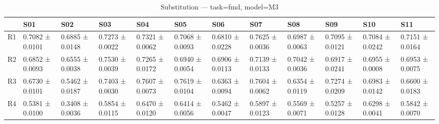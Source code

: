 \begin{table}[htbp]
\centering
\caption{Substitution — task=fmd, model=M3}
\label{tab:sub:fmd:M3}
\begin{tabular}{llllllllllll}
\toprule
\toprule
 & S01 & S02 & S03 & S04 & S05 & S06 & S07 & S08 & S09 & S10 & S11 \\
\midrule
\midrule
R1 & 0.7082 ± 0.0101 & 0.6885 ± 0.0148 & 0.7273 ± 0.0022 & 0.7321 ± 0.0062 & 0.7068 ± 0.0093 & 0.6810 ± 0.0228 & 0.7625 ± 0.0036 & 0.6987 ± 0.0063 & 0.7095 ± 0.0121 & 0.7084 ± 0.0242 & 0.7151 ± 0.0164 \\
R2 & 0.6852 ± 0.0093 & 0.6555 ± 0.0038 & 0.7530 ± 0.0039 & 0.7265 ± 0.0172 & 0.6940 ± 0.0054 & 0.6906 ± 0.0113 & 0.7139 ± 0.0133 & 0.7042 ± 0.0036 & 0.6917 ± 0.0241 & 0.6955 ± 0.0008 & 0.6953 ± 0.0075 \\
R3 & 0.6730 ± 0.0101 & 0.5462 ± 0.0187 & 0.7403 ± 0.0030 & 0.7607 ± 0.0073 & 0.7619 ± 0.0104 & 0.6363 ± 0.0094 & 0.7604 ± 0.0062 & 0.6354 ± 0.0119 & 0.7274 ± 0.0209 & 0.6983 ± 0.0142 & 0.6600 ± 0.0183 \\
R4 & 0.5381 ± 0.0100 & 0.3408 ± 0.0036 & 0.5854 ± 0.0115 & 0.6470 ± 0.0120 & 0.6414 ± 0.0056 & 0.5462 ± 0.0047 & 0.5897 ± 0.0123 & 0.5569 ± 0.0071 & 0.5257 ± 0.0128 & 0.6298 ± 0.0041 & 0.5842 ± 0.0070 \\
\bottomrule
\end{tabular}\end{table}
